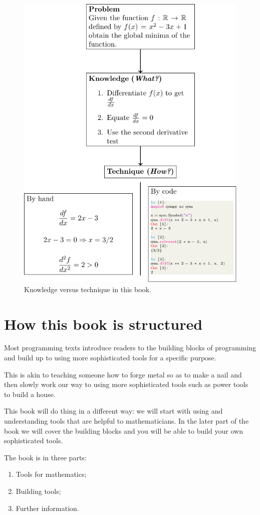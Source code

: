\begin{figure}[htbp!]
\centering

\includegraphics[width=0.500\linewidth]{assets/knowledge_vs_technique/main.pdf}
\caption{Knowledge versus technique in this
    book.}\label{fig:knowledge_versus_technique}
\end{figure}

\section{How this book is structured}

Most programming texts introduce readers to the building blocks of
programming and build up to using more sophisticated tools for a specific
purpose.

This is akin to teaching someone how to forge metal so as to make a nail and
then slowly work our way to using more sophisticated tools such as power tools
to build a house.

This book will do thing in a different way: we will start with using and
understanding tools that are helpful to mathematicians. In the later part of the
book we will cover the building blocks and you will be able to build your own
sophisticated tools.

The book is in three parts:
\begin{enumerate}
\item Tools for mathematics;
\item Building tools;
\item Further information.

\end{enumerate}

